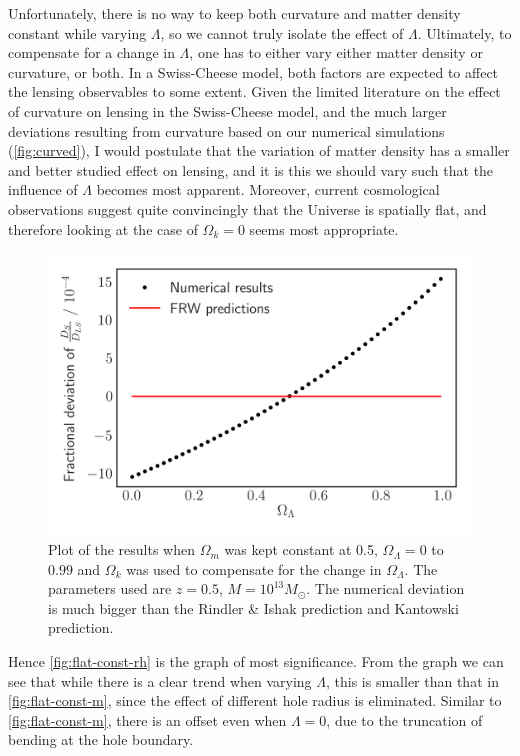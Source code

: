 Unfortunately, there is no way to keep both curvature and matter density constant while varying $\Lambda$, so we cannot truly isolate the effect of $\Lambda$. Ultimately, to compensate for a change in $\Lambda$, one has to either vary either matter density or curvature, or both. In a Swiss-Cheese model, both factors are expected to affect the lensing observables to some extent. Given the limited literature on the effect of curvature on lensing in the Swiss-Cheese model, and the much larger deviations resulting from curvature based on our numerical simulations (\autoref{fig:curved}), I would postulate that the variation of matter density has a smaller and better studied effect on lensing, and it is this we should vary such that the influence of $\Lambda$ becomes most apparent. Moreover, current cosmological observations \citep{ade2016planck,hinshaw2013nine,de2000flat} suggest quite convincingly that the Universe is spatially flat, and therefore looking at the case of $\Omega_k = 0$ seems most appropriate. 

\begin{figure}
  \centering
  \includegraphics[height=0.5\linewidth]{images/curved.png}
  \caption{Plot of the results when $\Omega_{m}$ was kept constant at 0.5, $\Omega_{\Lambda} = 0$ to $0.99$ and $\Omega_k$ was used to compensate for the change in $\Omega_{\Lambda}$. The parameters used are $z = 0.5$, $M = 10^{13} M_{\odot}$. The numerical deviation is much bigger than the Rindler \& Ishak prediction and Kantowski prediction.}
  \label{fig:curved}
\end{figure}

Hence \autoref{fig:flat-const-rh} is the graph of most significance. From the graph we can see that while there is a clear trend when varying $\Lambda$, this is smaller than that in \autoref{fig:flat-const-m}, since the effect of different hole radius is eliminated. Similar to \autoref{fig:flat-const-m}, there is an offset even when $\Lambda = 0$, due to the truncation of bending at the hole boundary. 

